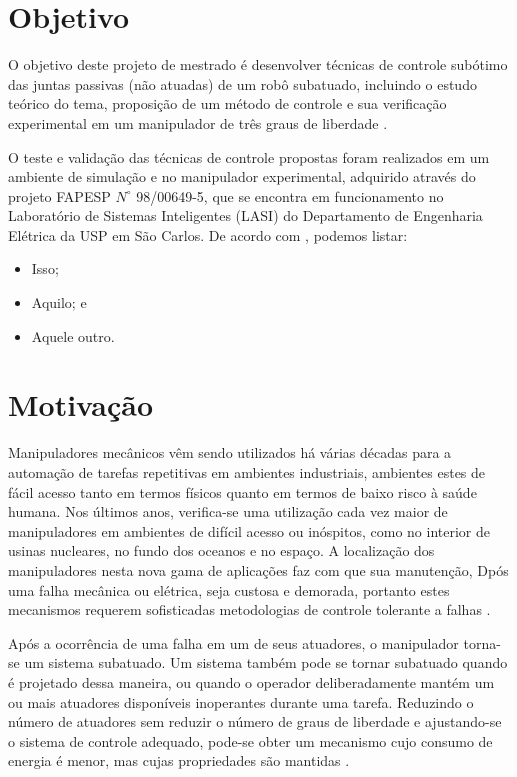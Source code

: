 \section{Objetivo}
O objetivo deste projeto de mestrado é desenvolver técnicas de controle subótimo das juntas passivas (não atuadas) de um robô subatuado, incluindo o estudo teórico do tema, proposição de um método de controle e sua verificação
experimental em um manipulador de três graus de liberdade \cite{Nascimento1970}.

O teste \cite{Patagonios2001} e validação das técnicas de controle propostas foram realizados em um ambiente de simulação e no manipulador
experimental, adquirido através do projeto FAPESP $N^{\circ}$ 98/00649-5, que se encontra em funcionamento no Laboratório de Sistemas Inteligentes (LASI) do Departamento de Engenharia Elétrica da USP em São Carlos. De acordo com , podemos listar:
\begin{itemize}
\item Isso;
\item Aquilo; e
\item Aquele outro.
\end{itemize}

\section{Motivação}
Manipuladores mecânicos \cite{Sbornian2002} vêm sendo utilizados há várias décadas para a automação de tarefas
repetitivas em ambientes industriais, ambientes estes de fácil acesso tanto em termos físicos quanto em termos de baixo
risco à saúde humana. Nos últimos anos, verifica-se uma utilização cada vez maior de manipuladores em
ambientes de difícil acesso ou inóspitos, como no interior de usinas nucleares, no fundo dos oceanos e no
espaço. A localização dos manipuladores nesta nova gama de aplicações faz com que sua manutenção,
Dpós uma falha mecânica ou elétrica, seja custosa e demorada, portanto estes mecanismos requerem sofisticadas
metodologias de controle tolerante a falhas \cite{ITALUS2004}.

Após a ocorrência de uma falha em um de seus atuadores, o manipulador torna-se um sistema subatuado. Um sistema também pode se tornar subatuado quando é projetado  dessa maneira, ou quando o operador deliberadamente mantém um ou mais atuadores disponíveis inoperantes durante uma tarefa. Reduzindo o número de atuadores sem reduzir o número de graus de
liberdade e ajustando-se o sistema de controle adequado, pode-se obter um mecanismo cujo consumo de energia é menor, mas cujas propriedades são mantidas \cite{Arystides1994}.

